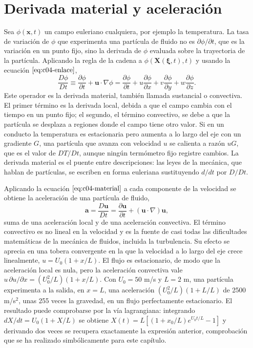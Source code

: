 \documentclass[10pt,openany]{book}
\begin{document}
\section{Derivada material y aceleración}

Sea \(\phi(\mathbf{x}, t)\) un campo euleriano cualquiera, por ejemplo la temperatura. La tasa de variación de \(\phi\) que experimenta una partícula de fluido no es \(\partial\phi/\partial t\), que es la variación en un punto fijo, sino la derivada de \(\phi\) evaluada sobre la trayectoria de la partícula. Aplicando la regla de la cadena a \(\phi(\mathbf{X}(\boldsymbol{\xi}, t), t)\) y usando la ecuación \(\eqref{eq:c04-enlace}\),
\begin{equation}
\frac{D\phi}{Dt} \equiv \frac{\partial \phi}{\partial t} + \mathbf{u}\cdot\nabla\phi = \frac{\partial \phi}{\partial t} + u\frac{\partial \phi}{\partial x} + v\frac{\partial \phi}{\partial y} + w\frac{\partial \phi}{\partial z}. \label{eq:c04-material}
\end{equation}
Este operador es la derivada material, también llamada sustancial o convectiva. El primer término es la derivada local, debida a que el campo cambia con el tiempo en un punto fijo; el segundo, el término convectivo, se debe a que la partícula se desplaza a regiones donde el campo tiene otro valor. Si en un conducto la temperatura es estacionaria pero aumenta a lo largo del eje con un gradiente \(G\), una partícula que avanza con velocidad \(u\) se calienta a razón \(uG\), que es el valor de \(DT/Dt\), aunque ningún termómetro fijo registre cambios. La derivada material es el puente entre descripciones: las leyes de la mecánica, que hablan de partículas, se escriben en forma euleriana sustituyendo \(d/dt\) por \(D/Dt\).

Aplicando la ecuación \(\eqref{eq:c04-material}\) a cada componente de la velocidad se obtiene la aceleración de una partícula de fluido,
\begin{equation}
\mathbf{a} = \frac{D\mathbf{u}}{Dt} = \frac{\partial \mathbf{u}}{\partial t} + (\mathbf{u}\cdot\nabla)\mathbf{u}, \label{eq:c04-aceleracion}
\end{equation}
suma de una aceleración local y de una aceleración convectiva. El término convectivo es no lineal en la velocidad y es la fuente de casi todas las dificultades matemáticas de la mecánica de fluidos, incluida la turbulencia. Su efecto se aprecia en una tobera convergente en la que la velocidad a lo largo del eje crece linealmente, \(u = U_0(1 + x/L)\). El flujo es estacionario, de modo que la aceleración local es nula, pero la aceleración convectiva vale \(u\,\partial u/\partial x = (U_0^{2}/L)(1 + x/L)\). Con \(U_0 = 50\) m/s y \(L = 2\) m, una partícula experimenta a la salida, en \(x = L\), una aceleración \((U_0^{2}/L)(1 + L/L)\) de 2500 m/s\(^2\), unas 255 veces la gravedad, en un flujo perfectamente estacionario. El resultado puede comprobarse por la vía lagrangiana: integrando \(dX/dt = U_0(1 + X/L)\) se obtiene \(X(t) = L[(1 + x_0/L)e^{U_0 t/L} - 1]\) y derivando dos veces se recupera exactamente la expresión anterior, comprobación que se ha realizado simbólicamente para este capítulo.
\end{document}
